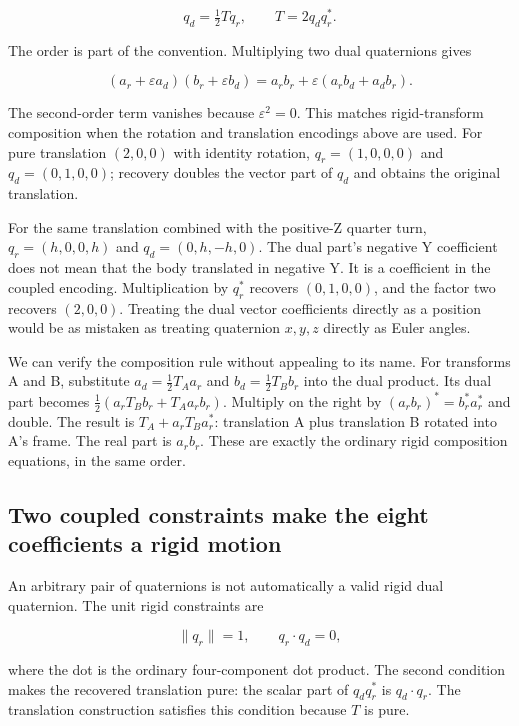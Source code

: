 \[
q_d=\tfrac12Tq_r,\qquad T=2q_dq_r^*.
\]

The order is part of the convention. Multiplying two dual quaternions gives

\[
(a_r+\varepsilon a_d)(b_r+\varepsilon b_d)
=a_rb_r+\varepsilon(a_rb_d+a_db_r).
\]

The second-order term vanishes because \(\varepsilon^2=0\). This matches rigid-transform composition when the rotation and translation encodings above are used. For pure translation \((2,0,0)\) with identity rotation, \(q_r=(1,0,0,0)\) and \(q_d=(0,1,0,0)\); recovery doubles the vector part of \(q_d\) and obtains the original translation.

For the same translation combined with the positive-Z quarter turn, \(q_r=(h,0,0,h)\) and \(q_d=(0,h,-h,0)\). The dual part's negative Y coefficient does not mean that the body translated in negative Y. It is a coefficient in the coupled encoding. Multiplication by \(q_r^*\) recovers \((0,1,0,0)\), and the factor two recovers \((2,0,0)\). Treating the dual vector coefficients directly as a position would be as mistaken as treating quaternion \(x,y,z\) directly as Euler angles.

We can verify the composition rule without appealing to its name. For transforms A and B, substitute \(a_d=\tfrac12T_Aa_r\) and \(b_d=\tfrac12T_Bb_r\) into the dual product. Its dual part becomes \(\tfrac12(a_rT_Bb_r+T_Aa_rb_r)\). Multiply on the right by \((a_rb_r)^*=b_r^*a_r^*\) and double. The result is \(T_A+a_rT_Ba_r^*\): translation A plus translation B rotated into A's frame. The real part is \(a_rb_r\). These are exactly the ordinary rigid composition equations, in the same order.

\subsection{Two coupled constraints make the eight coefficients a rigid motion}\label{01-foundations-i-ch019-two-coupled-constraints-make-the-eight-coefficients-a-rigid-motion}

An arbitrary pair of quaternions is not automatically a valid rigid dual quaternion. The unit rigid constraints are

\[
\|q_r\|=1,\qquad q_r\cdot q_d=0,
\]

where the dot is the ordinary four-component dot product. The second condition makes the recovered translation pure: the scalar part of \(q_dq_r^*\) is \(q_d\cdot q_r\). The translation construction satisfies this condition because \(T\) is pure.


